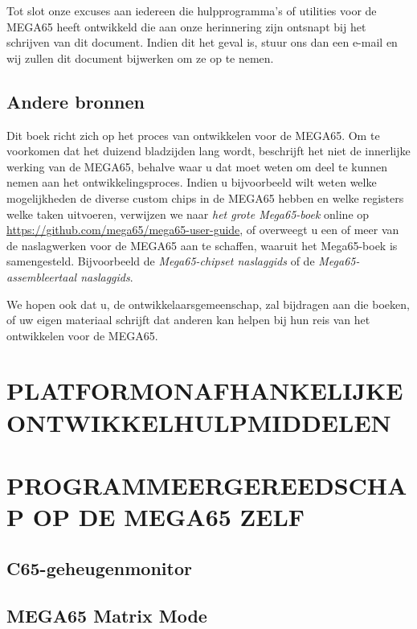 Tot slot onze excuses aan iedereen die hulpprogramma's of utilities
voor de MEGA65 heeft ontwikkeld die aan onze herinnering zijn ontsnapt bij het schrijven van dit
document. Indien dit het geval is, stuur ons dan een e-mail en wij zullen
dit document bijwerken om ze op te nemen.

\chapter{Andere bronnen}

Dit boek richt zich op het proces van ontwikkelen voor de MEGA65. Om
te voorkomen dat het duizend bladzijden lang wordt, beschrijft het niet de innerlijke
werking van de MEGA65, behalve waar u dat moet weten om
deel te kunnen nemen aan het ontwikkelingsproces. Indien u bijvoorbeeld
wilt weten welke mogelijkheden de diverse custom chips in de
MEGA65 hebben en welke registers welke taken uitvoeren, verwijzen we naar {\em het
grote Mega65-boek} online
op \url{https://github.com/mega65/mega65-user-guide}, of overweegt u
een of meer van de naslagwerken voor de MEGA65 aan te schaffen, waaruit
het Mega65-boek is samengesteld. Bijvoorbeeld de {\em Mega65-chipset naslaggids} of de {\em Mega65-assembleertaal naslaggids}.

We hopen ook dat u, de ontwikkelaarsgemeenschap, zal bijdragen aan
die boeken, of uw eigen materiaal schrijft dat anderen kan helpen bij hun
reis van het ontwikkelen voor de MEGA65.

\part{PLATFORMONAFHANKELIJKE ONTWIKKELHULPMIDDELEN}








\part{PROGRAMMEERGEREEDSCHAP OP DE MEGA65 ZELF}

\chapter{C65-geheugenmonitor}

\chapter{MEGA65 Matrix Mode}

